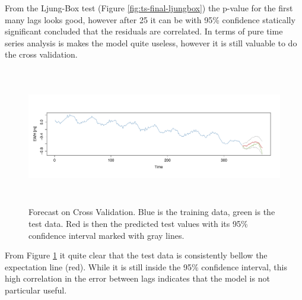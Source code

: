 From the Ljung-Box test (Figure \ref{fig:ts-final-ljungbox}) the p-value for the first many lags looks good, however after 25 it can be with 95\% confidence statically significant concluded that the residuals are correlated. In terms of pure time series analysis is makes the model quite useless, however it is still valuable to do the cross validation.

\begin{figure}[H]
\centering
\centerline{\includegraphics[height=6cm]{figures/ts-final-forecast}}
\caption{Forecast on Cross Validation. Blue is the training data, green is the test data. Red is then the predicted test values with its 95\% confidence interval marked with gray lines.}
\label{fig:ts-final-forecast}
\end{figure}

From Figure \ref{fig:ts-final-forecast} it quite clear that the test data is consistently bellow the expectation line (red). While it is still inside the 95\% confidence interval, this high correlation in the error between lags indicates that the model is not particular useful. 
